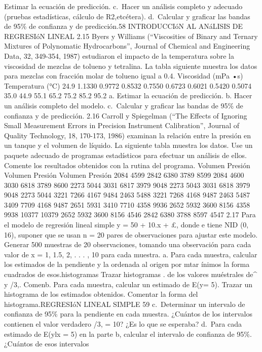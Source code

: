 \documentclass[
]{article}
\begin{document}
Estimar la ecuación de predicción. c.~Hacer un análisis completo y
adecuado (pruebas estadísticas, cálculo de R2,etcétera). d.~Calcular y
graficar las bandas de 95\% de confianza y de predicción.58 INTRODUCCIóN
AL ANáLISIS DE REGRESIóN LINEAL 2.15 Byers y Williams (``Viscosities of
Binary and Ternary Mixtures of Polynomatic Hydrocarbons'', Journal of
Chemical and Engineering Data, 32, 349-354, 1987) estudiaron el impacto
de la temperatura sobre la viscosidad de mezclas de tolueno y tetralina.
La tabla siguiente muestra los datos para mezclas con fracción molar de
tolueno igual a 0.4. Viscosidad (mPa •s) Temperatura (°C) 24.9 1.1330
0.9772 0.8532 0.7550 0.6723 0.6021 0.5420 0.5074 35.0 44.9 55.1 65.2
75.2 85.2 95.2 a. Estimar la ecuación de predicción. b. Hacer un
análisis completo del modelo. c.~Calcular y graficar las bandas de 95\%
de confianza y de predicción. 2.16 Carroll y Spiegelman (``The Effects
of Ignoring Small Measurement Errors in Precision Instrument
Calibration'', Journal of Quality Technology, 18, 170-173, 1986)
examinan la relación entre la presión en un tanque y el volumen de
líquido. La siguiente tabla muestra los datos. Use un paquete adecuado
de programas estadísticos para efectuar un análisis de ellos. Comente
los resultados obtenidos con la rutina del programa. Volumen Presión
Volumen Presión Volumen Presión 2084 4599 2842 6380 3789 8599 2084 4600
3030 6818 3789 8600 2273 5044 3031 6817 3979 9048 2273 5043 3031 6818
3979 9048 2273 5044 3221 7266 4167 9484 2463 5488 3221 7268 4168 9487
2463 5487 3409 7709 4168 9487 2651 5931 3410 7710 4358 9936 2652 5932
3600 8156 4358 9938 10377 10379 2652 5932 3600 8156 4546 2842 6380 3788
8597 4547 2.17 Para el modelo de regresión lineal simple y = 50 + 10.x +
£, donde e tiene NID (0, 16), suponer que se usan n = 20 pares de
observaciones para ajustar este modelo. Generar 500 muestras de 20
observaciones, tomando una observación para cada valor de x = 1, 1.5, 2,
. . . , 10 para cada muestra. a. Para cada muestra, calcular los
estimados de la pendiente y la ordenada al origen por mtar ínimos la
forma cuadrados de esos.histogramas Trazar histogramas . de los valores
muéstrales de\^{} y /3,. Comenb. Para cada muestra, calcular un estimado
de E(y\x = 5). Trazar un histograma de los estimados obtenidos. Comentar
la forma del histograma.REGRESIóN LINEAL SIMPLE 59 c.~Determinar un
intervalo de confianza de 95\% para la pendiente en cada muestra.
¿Cuántos de los intervalos contienen el valor verdadero /3, = 10? ¿Es lo
que se esperaba? d.~Para cada estimado de E(ylx = 5) en la parte b,
calcular el intervalo de confianza de 95\%. ¿Cuántos de esos intervalos
\end{document}
